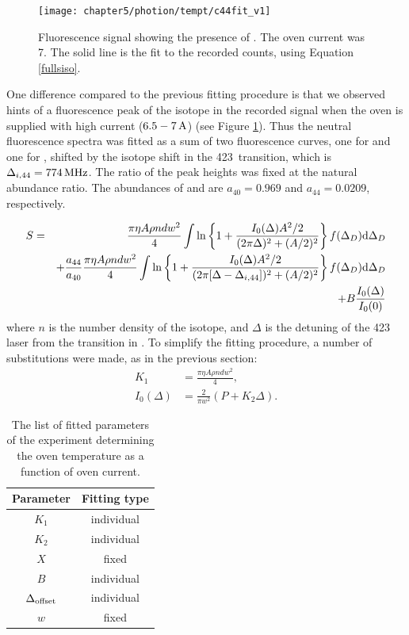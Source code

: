 \begin{figure}[t]
\centering
\texttt{[image: chapter5/photion/tempt/c44fit\_v1]}
\caption[Fluorescence signal showing presence Calcium-44 isotope]{Fluorescence signal showing the presence of . The oven current was 7\A. The solid line is the fit to the recorded counts, using Equation \ref{fullsiso}.}
\label{fig:ca44}
\end{figure} 


One difference compared to the previous fitting procedure is that we observed hints of a fluorescence peak of the  isotope in the recorded signal when the oven is supplied with high current ($6.5-7 \,\mbox{A}$) (see Figure \ref{fig:ca44}). Thus the neutral fluorescence spectra was fitted as a sum of two fluorescence curves, one for   and one for , shifted by the isotope shift in the 423\nm\, transition, which is $\Delta_{i,44} = 774 \,\mbox{MHz}$. The ratio of the peak heights was fixed at the natural abundance ratio. The abundances of  and  are $a_{40} = 0.969$ and $a_{44} = 0.0209$, respectively.

\begin{eqnarray}
\nonumber S & = & \frac{\pi \eta A \rho n d w^2}{4} \int \ln \left\{1 + \frac{I_0(\Delta) A^2/2}{(2 \pi \Delta)^2 + (A/2)^2}\right\} f(\Delta_D) \mbox{d}\Delta_D\\ 
\nonumber   &  & + \frac{a_{44}}{a_{40}}\frac{\pi \eta A \rho n d w^2}{4} \int \ln \left\{1 + \frac{I_0(\Delta) A^2/2}{(2 \pi [\Delta-\Delta_{i,44}])^2 + (A/2)^2}\right\}  f(\Delta_D) \mbox{d}\Delta_D\\
  &  & + B\frac{I_0(\Delta)}{I_0(0)}
\label{fullsiso}
\end{eqnarray}
where $n$ is the number density of the  isotope, and $\Delta$ is the detuning of the 423\nm\, laser from the transition in . To simplify the fitting procedure, a number of substitutions were made, as in the previous section:
\begin{align}
K_1 & = \frac{\pi \eta A \rho n d w^2}{4}, \\
I_0(\Delta) & = \frac{2}{\pi w^2} (P + K_2 \Delta).
\end{align}



\begin{table}[t!]
\begin{center}
\begin{tabular}{|c|c|}
\hline \textbf{Parameter} & \textbf{Fitting type}  \\ 
\hline 
$K_1$ & individual \\
$K_2$ & individual \\
$X$ & fixed \\
$B$ & individual \\
$\Delta_{\rm offset}$ & individual \\
$w$ & fixed \\
\hline 
\end{tabular} 
\caption{The list of fitted parameters of the experiment determining the \CaI{} oven temperature as a function of oven current.}
\label{tab:neutralfluofit3}
\end{center}
\end{table}

